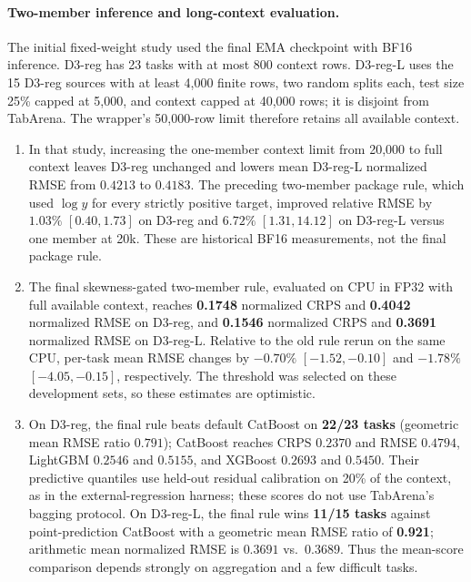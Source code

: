\documentclass[11pt]{article}
\begin{document}
\paragraph{Two-member inference and long-context evaluation.}
The initial fixed-weight study used the final EMA checkpoint with BF16 inference. D3-reg has 23 tasks with at most 800 context rows. D3-reg-L uses the 15 D3-reg sources with at least 4,000 finite rows, two random splits each, test size 25\% capped at 5,000, and context capped at 40,000 rows; it is disjoint from TabArena. The wrapper's 50,000-row limit therefore retains all available context. %
\begin{enumerate}
\item In that study, increasing the one-member context limit from 20,000 to full context leaves D3-reg unchanged and lowers mean D3-reg-L normalized RMSE from $0.4213$ to $0.4183$. The preceding two-member package rule, which used $\log y$ for every strictly positive target, improved relative RMSE by $1.03\%$ $[0.40,1.73]$ on D3-reg and $6.72\%$ $[1.31,14.12]$ on D3-reg-L versus one member at 20k. These are historical BF16 measurements, not the final package rule. %
\item The final skewness-gated two-member rule, evaluated on CPU in FP32 with full available context, reaches \textbf{0.1748} normalized CRPS and \textbf{0.4042} normalized RMSE on D3-reg, and \textbf{0.1546} normalized CRPS and \textbf{0.3691} normalized RMSE on D3-reg-L. Relative to the old rule rerun on the same CPU, per-task mean RMSE changes by $-0.70\%$ $[-1.52,-0.10]$ and $-1.78\%$ $[-4.05,-0.15]$, respectively. The threshold was selected on these development sets, so these estimates are optimistic. %
\item On D3-reg, the final rule beats default CatBoost on \textbf{22/23 tasks} (geometric mean RMSE ratio $0.791$); CatBoost reaches CRPS $0.2370$ and RMSE $0.4794$, LightGBM $0.2546$ and $0.5155$, and XGBoost $0.2693$ and $0.5450$. Their predictive quantiles use held-out residual calibration on 20\% of the context, as in the external-regression harness; these scores do not use TabArena's bagging protocol. %
On D3-reg-L, the final rule wins \textbf{11/15 tasks} against point-prediction CatBoost with a geometric mean RMSE ratio of \textbf{0.921}; arithmetic mean normalized RMSE is $0.3691$ vs.\ $0.3689$. Thus the mean-score comparison depends strongly on aggregation and a few difficult tasks. %
\end{enumerate}
\end{document}
